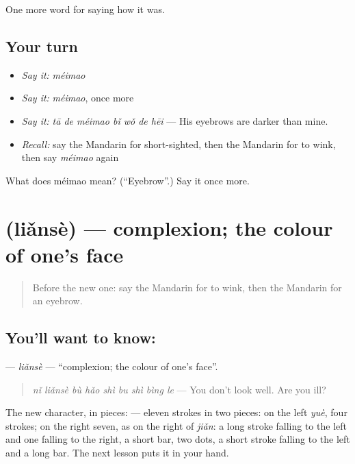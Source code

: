 \begin{grammarlens}[title={What you've built}]
One more word for saying how it was.
\end{grammarlens}

\subsection*{Your turn}
\begin{itemize}
\raggedright
  \item \emph{Say it:} \emph{méimao}
  \item \emph{Say it:} \emph{méimao}, once more
  \item \emph{Say it:} \emph{tā de méimao bǐ wǒ de hēi} — His eyebrows are darker than mine.
  \item \emph{Recall:} say the Mandarin for short-sighted, then the Mandarin for to wink, then say \emph{méimao} again
\end{itemize}

\begin{tcolorbox}[breakable,colback=teal!4,colframe=teal!35!black,title={Before you move on}]
What does méimao mean? (\textquotedblleft{}Eyebrow\textquotedblright{}.) Say it once more.
\end{tcolorbox}
\section[\texorpdfstring{\zh{脸色} (liǎnsè)}{脸色 (liǎnsè)}]{ (liǎnsè) — complexion; the colour of one's face}

\label{lesson:ZH-C472-lianse}



\begin{quote}
Before the new one: say the Mandarin for to wink, then the Mandarin for an eyebrow.
\end{quote}

\subsection*{You'll want to know: }
\textbf{} — \emph{liǎnsè} — \textquotedblleft{}complexion; the colour of one's face\textquotedblright{}.

\begin{quote}
\textbf{} \emph{nǐ liǎnsè bù hǎo shì bu shì bìng le} — You don't look well. Are you ill?
\end{quote}

The new character, in pieces:  — eleven strokes in two pieces: on the left  \emph{yuè}, four strokes; on the right seven, as on the right of  \emph{jiǎn}: a long stroke falling to the left and one falling to the right, a short bar, two dots, a short stroke falling to the left and a long bar. The next lesson puts it in your hand.

